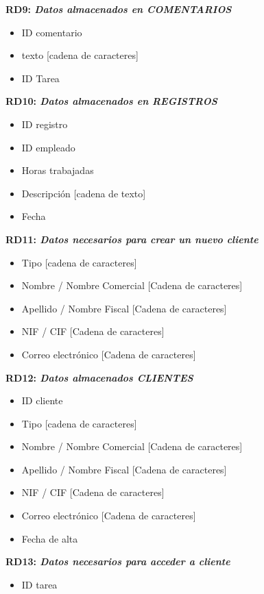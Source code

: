 \documentclass[paper=a4, fontsize=11pt, spanish]{scrartcl}
\begin{document}
\setlength{\parindent}{0em}
\textbf{RD9: \textit{Datos almacenados en COMENTARIOS}}
\setlength{\parindent}{2em}
\begin{itemize}
\item ID comentario
\item texto [cadena de caracteres]
\item ID Tarea
\end{itemize}

\setlength{\parindent}{0em}
\textbf{RD10: \textit{Datos almacenados en REGISTROS}}
\setlength{\parindent}{2em}
\begin{itemize}
\item ID registro
\item ID empleado
\item Horas trabajadas
\item Descripción [cadena de texto]
\item Fecha
\end{itemize}

\setlength{\parindent}{0em}
\textbf{RD11: \textit{ Datos necesarios para crear un nuevo cliente}}
\setlength{\parindent}{2em}
\begin{itemize}
\item Tipo [cadena de caracteres]
\item Nombre / Nombre Comercial [Cadena de caracteres]
\item Apellido / Nombre Fiscal [Cadena de caracteres]
\item NIF / CIF [Cadena de caracteres]
\item Correo electrónico [Cadena de caracteres]
\end{itemize}

\setlength{\parindent}{0em}
\textbf{RD12: \textit{Datos almacenados CLIENTES}}
\setlength{\parindent}{2em}
\begin{itemize}
\item ID cliente
\item Tipo [cadena de caracteres]
\item Nombre / Nombre Comercial [Cadena de caracteres]
\item Apellido / Nombre Fiscal [Cadena de caracteres]
\item NIF / CIF [Cadena de caracteres]
\item Correo electrónico [Cadena de caracteres]
\item Fecha de alta
\end{itemize}

\setlength{\parindent}{0em}
\textbf{RD13: \textit{Datos necesarios para acceder a cliente}}
\setlength{\parindent}{2em}
\begin{itemize}
\item ID tarea
\end{itemize}
\end{document}

